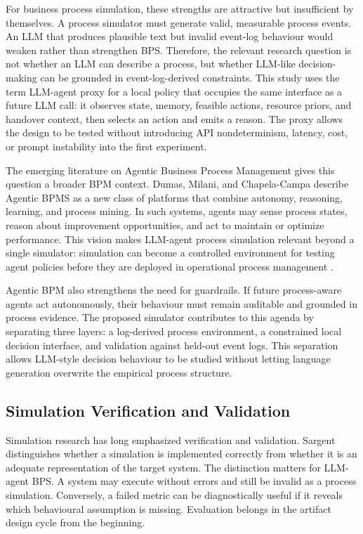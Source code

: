 For business process simulation, these strengths are attractive but
insufficient by themselves. A process simulator must generate valid,
measurable process events. An LLM that produces plausible text but
invalid event-log behaviour would weaken rather than strengthen BPS.
Therefore, the relevant research question is not whether an LLM can
describe a process, but whether LLM-like decision-making can be grounded
in event-log-derived constraints. This study uses the term LLM-agent
proxy for a local policy that occupies the same interface as a future
LLM call: it observes state, memory, feasible actions, resource priors,
and handover context, then selects an action and emits a reason. The
proxy allows the design to be tested without introducing API
nondeterminism, latency, cost, or prompt instability into the first
experiment.

The emerging literature on Agentic Business Process Management gives
this question a broader BPM context. Dumas, Milani, and Chapela-Campa
describe Agentic BPMS as a new class of platforms that combine
autonomy, reasoning, learning, and process mining. In such systems,
agents may sense process states, reason about improvement opportunities,
and act to maintain or optimize performance. This vision makes LLM-agent
process simulation relevant beyond a single simulator: simulation can
become a controlled environment for testing agent policies before they
are deployed in operational process management \cite{dumas2026agenticbpms}.

Agentic BPM also strengthens the need for guardrails. If future
process-aware agents act autonomously, their behaviour must remain
auditable and grounded in process evidence. The proposed simulator
contributes to this agenda by separating three layers: a log-derived
process environment, a constrained local decision interface, and
validation against held-out event logs. This separation allows
LLM-style decision behaviour to be studied without letting language
generation overwrite the empirical process structure.

\subsection{Simulation Verification and
Validation}\label{simulation-verification-and-validation}

Simulation research has long emphasized verification and validation.
Sargent~\cite{sargent2013vv} distinguishes whether a simulation is implemented
correctly from whether it is an adequate representation of the target
system. The distinction matters for LLM-agent BPS. A system may
execute without errors and still be invalid as a process simulation.
Conversely, a failed metric can be diagnostically useful if it reveals
which behavioural assumption is missing. Evaluation belongs in the
artifact design cycle from the beginning.

